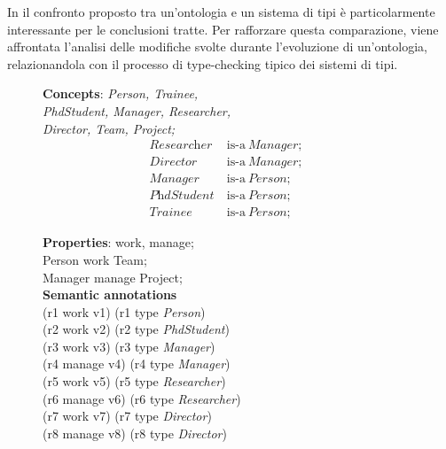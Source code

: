 In \cite{despeyroux2008evolution} il confronto proposto tra un'ontologia e un sistema di tipi è particolarmente interessante per le conclusioni tratte. Per rafforzare questa comparazione, viene affrontata l'analisi delle modifiche svolte durante l'evoluzione di un'ontologia, relazionandola con il processo di type-checking tipico dei sistemi di tipi.

\begin{figure}
	\begin{minipage}[t]{0.45\textwidth}
			\textbf{Concepts}: \textit{Person, Trainee,\\
			PhdStudent, Manager, Researcher,\\
			Director, Team,
			Project;}
			\begin{align}
			\textit{Researcher}\ &\text{is-a}\ \textit{Manager};&\\
			\textit{Director}\ &\text{is-a}\ \textit{Manager};&\\
			\textit{Manager}\ &\text{is-a}\ \textit{Person};&\\
			\textit{PhdStudent}\ &\text{is-a}\ \textit{Person};&\\
			\textit{Trainee}\ &\text{is-a}\ \textit{Person};&
			\end{align}
			
			\textbf{Properties}: work, manage;\\
			Person work Team;\\
			Manager manage Project;\\

		\textbf{Semantic annotations}\\
			(r1 work v1) (r1 type \textit{Person})\\
			(r2 work v2) (r2 type \textit{PhdStudent})\\
			(r3 work v3) (r3 type \textit{Manager})\\
			(r4 manage v4) (r4 type \textit{Manager})\\
			(r5 work v5) (r5 type \textit{Researcher})\\
			(r6 manage v6) (r6 type \textit{Researcher})\\
			(r7 work v7) (r7 type \textit{Director})\\
			(r8 manage v8) (r8 type \textit{Director})\\

	\end{minipage}
	\hspace{0.05\textwidth}
	\begin{minipage}[t]{0.45\textwidth}
		

\end{minipage}
\end{figure}
